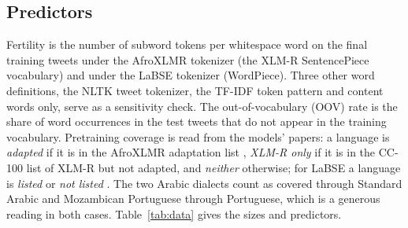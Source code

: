 \documentclass[11pt]{article}
\begin{document}
\subsection{Predictors}
Fertility is the number of subword tokens per whitespace word on the final training tweets under the AfroXLMR tokenizer (the XLM-R SentencePiece vocabulary) and under the LaBSE tokenizer (WordPiece). Three other word definitions, the NLTK tweet tokenizer, the TF-IDF token pattern and content words only, serve as a sensitivity check. The out-of-vocabulary (OOV) rate is the share of word occurrences in the test tweets that do not appear in the training vocabulary. Pretraining coverage is read from the models' papers: a language is \emph{adapted} if it is in the AfroXLMR adaptation list \citep[Table 9]{alabi2022adapting}, \emph{XLM-R only} if it is in the CC-100 list of XLM-R \citep[Table 6]{conneau2020xlmr} but not adapted, and \emph{neither} otherwise; for LaBSE a language is \emph{listed} or \emph{not listed} \citep[Table 10]{feng2022labse}. The two Arabic dialects count as covered through Standard Arabic and Mozambican Portuguese through Portuguese, which is a generous reading in both cases. Table~\ref{tab:data} gives the sizes and predictors.
\end{document}
